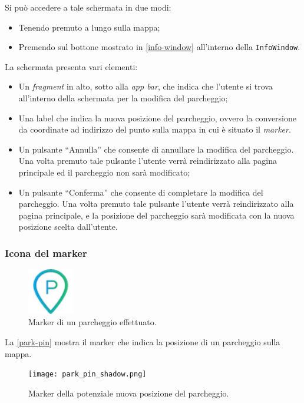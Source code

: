 Si può accedere a tale schermata in due modi:

\begin{itemize}
    \item Tenendo premuto a lungo sulla mappa;
    \item Premendo sul bottone mostrato in \autoref{info-window} all'interno della \texttt{InfoWindow}.
\end{itemize}
La schermata presenta vari elementi:

\begin{itemize}
    \item Un \emph{fragment} in alto, sotto alla \emph{app bar}, che indica che l'utente si trova all'interno della schermata per la modifica del parcheggio;
    \item Una label che indica la nuova posizione del parcheggio, ovvero la conversione da coordinate ad indirizzo del punto sulla mappa in cui è situato il \emph{marker}. 
    \item Un pulsante ``Annulla'' che consente di annullare la modifica del parcheggio. Una volta premuto tale pulsante l'utente verrà reindirizzato alla pagina principale ed il parcheggio non sarà modificato;
    \item Un pulsante ``Conferma'' che consente di completare la modifica del parcheggio. Una volta premuto tale pulsante l'utente verrà reindirizzato alla pagina principale, e la posizione del parcheggio sarà modificata con la nuova posizione scelta dall'utente.
\end{itemize}
\hypertarget{icona-del-marker}{%
\subsubsection{Icona del marker}\label{icona-del-marker}}

\begin{figure}[H]
\centering
\includegraphics[width=2cm]{images/park_pin.png}
\caption{Marker di un parcheggio effettuato.}
\label{park-pin}
\end{figure}

La \autoref{park-pin} mostra il marker che indica la posizione di un parcheggio sulla mappa.

\begin{figure}[H]
\centering
\texttt{[image: park\_pin\_shadow.png]}
\caption{Marker della potenziale nuova posizione del parcheggio.}
\label{park-pin-shadow}
\end{figure}

